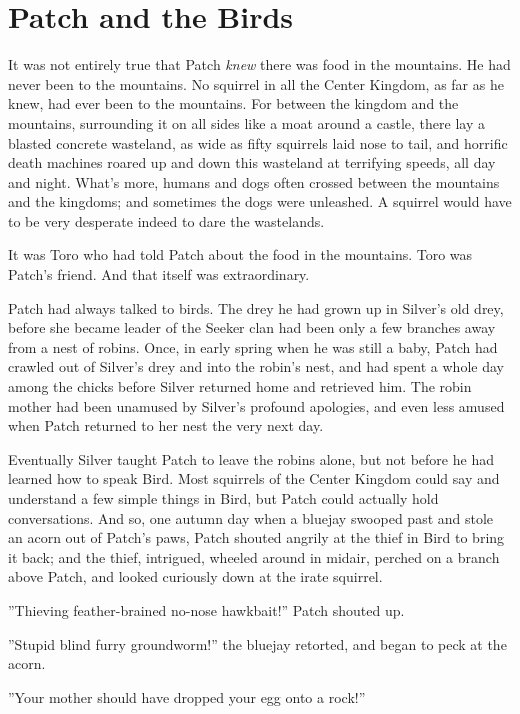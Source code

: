\documentclass[12pt]{book}
\begin{document}
\section{Patch and the Birds}

 It was not entirely true that Patch {\it knew} there was food in the mountains. He had never been to the mountains. No squirrel in all the Center Kingdom, as far as he knew, had ever been to the mountains. For between the kingdom and the mountains, surrounding it on all sides like a moat around a castle, there lay a blasted concrete wasteland, as wide as fifty squirrels laid nose to tail, and horrific death machines roared up and down this wasteland at terrifying speeds, all day and night. What's more, humans and dogs often crossed between the mountains and the kingdoms; and sometimes the dogs were unleashed. A squirrel would have to be very desperate indeed to dare the wastelands.\par
 It was Toro who had told Patch about the food in the mountains. Toro was Patch's friend. And that itself was extraordinary.\par
 Patch had always talked to birds. The drey he had grown up in %
 Silver's old drey, before she became leader of the Seeker clan %
 had been only a few branches away from a nest of robins. Once, in early spring when he was still a baby, Patch had crawled out of Silver's drey and into the robin's nest, and had spent a whole day among the chicks before Silver returned home and retrieved him. The robin mother had been unamused by Silver's profound apologies, and even less amused when Patch returned to her nest the very next day.\par
Eventually Silver taught Patch to leave the robins alone, but not before he had learned how to speak Bird. Most squirrels of the Center Kingdom could say and understand a few simple things in Bird, but Patch could actually hold conversations. And so, one autumn day when a bluejay swooped past and stole an acorn out of Patch's paws, Patch shouted angrily at the thief in Bird to bring it back; and the thief, intrigued, wheeled around in midair, perched on a branch above Patch, and looked curiously down at the irate squirrel.\par
''Thieving feather-brained no-nose hawkbait!'' Patch shouted up.\par
''Stupid blind furry groundworm!'' the bluejay retorted, and began to peck at the acorn.\par
''Your mother should have dropped your egg onto a rock!''\par
\end{document}
